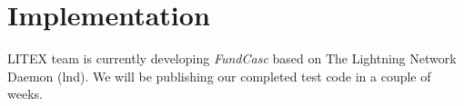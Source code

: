 \section{Implementation}
\label{sec:eval}

LITEX team is currently developing {\em FundCasc} based on The Lightning Network Daemon (lnd)\cite{LND}. We will be publishing our completed test code in a couple of weeks.